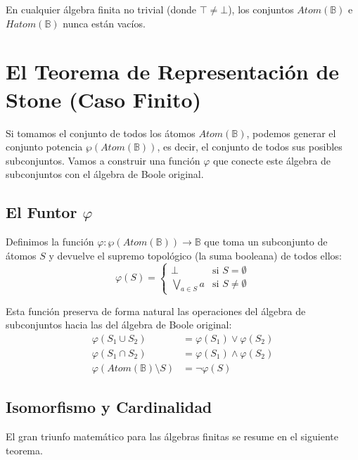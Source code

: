En cualquier álgebra finita no trivial (donde $\top \ne \bot$), los conjuntos $\mathit{Atom}(\mathbb{B})$ e $\mathit{Hatom}(\mathbb{B})$ nunca están vacíos.

\section{El Teorema de Representación de Stone (Caso Finito)}

Si tomamos el conjunto de todos los átomos $\mathit{Atom}(\mathbb{B})$, podemos generar el conjunto potencia $\wp(\mathit{Atom}(\mathbb{B}))$, es decir, el conjunto de todos sus posibles subconjuntos. Vamos a construir una función $\varphi$ que conecte este álgebra de subconjuntos con el álgebra de Boole original.

\subsection{El Funtor $\varphi$}
Definimos la función $\varphi : \wp(\mathit{Atom}(\mathbb{B})) \to \mathbb{B}$ que toma un subconjunto de átomos $S$ y devuelve el supremo topológico (la suma booleana) de todos ellos:
\[
\varphi(S) = \begin{cases}
\bot & \text{si } S = \emptyset \\
\bigvee_{a \in S} a & \text{si } S \ne \emptyset
\end{cases}
\]

Esta función preserva de forma natural las operaciones del álgebra de subconjuntos hacia las del álgebra de Boole original:
\begin{align*}
\varphi(S_1 \cup S_2) &= \varphi(S_1) \vee \varphi(S_2) \\
\varphi(S_1 \cap S_2) &= \varphi(S_1) \wedge \varphi(S_2) \\
\varphi(\mathit{Atom}(\mathbb{B}) \setminus S) &= \neg \varphi(S)
\end{align*}

\subsection{Isomorfismo y Cardinalidad}
El gran triunfo matemático para las álgebras finitas se resume en el siguiente teorema.

